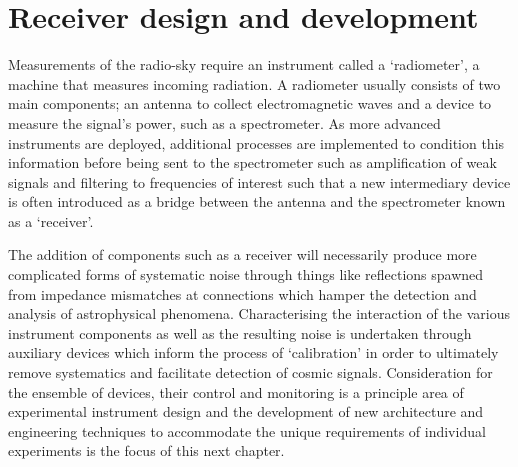 \chapter{Receiver design and development}\label{chap:instrumentation}

\ifpdf
    \graphicspath{{instrumentation/figs/Raster/}{instrumentation/figs/PDF/}{instrumentation/figs/}}
\else
    \graphicspath{{instrumentation/figs/Vector/}{instrumentation/figs/}}
\fi

Measurements of the radio-sky require an instrument called a ‘radiometer’, a machine that measures incoming radiation. A radiometer usually consists of two main components; an antenna to collect electromagnetic waves and a device to measure the signal's power, such as a spectrometer. As more advanced instruments are deployed, additional processes are implemented to condition this information before being sent to the spectrometer such as amplification of weak signals and filtering to frequencies of interest such that a new intermediary device is often introduced as a bridge between the antenna and the spectrometer known as a ‘receiver’.

The addition of components such as a receiver will necessarily produce more complicated forms of systematic noise through things like reflections spawned from impedance mismatches at connections which hamper the detection and analysis of astrophysical phenomena. Characterising the interaction of the various instrument components as well as the resulting noise is undertaken through auxiliary devices which inform the process of ‘calibration’ in order to ultimately remove systematics and facilitate detection of cosmic signals. Consideration for the ensemble of devices, their control and monitoring is a principle area of experimental instrument design and the development of new architecture and engineering techniques to accommodate the unique requirements of individual experiments is the focus of this next chapter.



